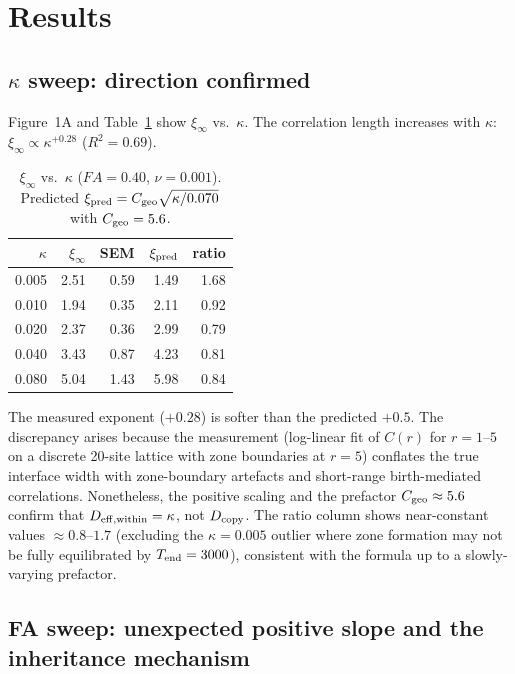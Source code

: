 \documentclass[11pt]{article}
\begin{document}
\section{Results}

\subsection{$\kappa$ sweep: direction confirmed}

Figure~1A and Table~\ref{tab:kappa} show $\xi_\infty$ vs.\ $\kappa$.
The correlation length increases with $\kappa$:
$\xi_\infty \propto \kappa^{+0.28}$ ($R^2=0.69$).

\begin{table}[ht]
\centering
\caption{$\xi_\infty$ vs.\ $\kappa$ ($FA=0.40$, $\nu=0.001$).
Predicted $\xi_{\rm pred} = C_{\rm geo}\sqrt{\kappa/0.070}$
with $C_{\rm geo}=5.6$.}
\label{tab:kappa}
\begin{tabular}{rrrrr}
\toprule
$\kappa$ & $\xi_\infty$ & SEM & $\xi_{\rm pred}$ & ratio \\
\midrule
0.005 & 2.51 & 0.59 & 1.49 & 1.68 \\
0.010 & 1.94 & 0.35 & 2.11 & 0.92 \\
0.020 & 2.37 & 0.36 & 2.99 & 0.79 \\
0.040 & 3.43 & 0.87 & 4.23 & 0.81 \\
0.080 & 5.04 & 1.43 & 5.98 & 0.84 \\
\bottomrule
\end{tabular}
\end{table}

The measured exponent ($+0.28$) is softer than the predicted $+0.5$.
The discrepancy arises because the measurement (log-linear fit of $C(r)$ for
$r=1$--$5$ on a discrete 20-site lattice with zone boundaries at $r=5$) conflates
the true interface width with zone-boundary artefacts and short-range
birth-mediated correlations.
Nonetheless, the positive scaling and the prefactor $C_{\rm geo}\approx 5.6$
confirm that $D_{\rm eff,within} = \kappa$, not $D_{\rm copy}$.
The ratio column shows near-constant values $\approx 0.8$--$1.7$
(excluding the $\kappa=0.005$ outlier where zone formation may not be
fully equilibrated by $T_{\rm end}=3000$), consistent with the formula up to
a slowly-varying prefactor.

\subsection{FA sweep: unexpected positive slope and the inheritance mechanism}
\end{document}
